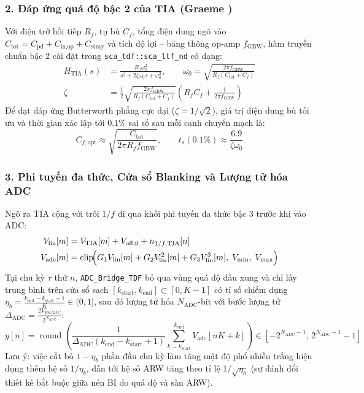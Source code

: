\documentclass[11pt, a4paper]{article}
\begin{document}
\subsubsection*{2. Đáp ứng quá độ bậc 2 của TIA (Graeme \cite{graeme1996})}
Với điện trở hồi tiếp $R_f$, tụ bù $C_f$, tổng điện dung ngõ vào $C_{\text{tot}} = C_{\text{pd}} + C_{\text{in,op}} + C_{\text{stray}}$ và tích độ lợi -- băng thông op-amp $f_{\text{GBW}}$, hàm truyền chuẩn bậc 2 cài đặt trong \texttt{sca\_tdf::sca\_ltf\_nd} có dạng:
\begin{align}
H_{\text{TIA}}(s) &= \frac{R_f \omega_0^2}{s^2 + 2\zeta\omega_0 s + \omega_0^2}, \qquad
\omega_0 = \sqrt{\frac{2\pi f_{\text{GBW}}}{R_f (C_{\text{tot}} + C_f)}} \\
\zeta &= \frac{1}{2}\sqrt{\frac{2\pi f_{\text{GBW}}}{R_f(C_{\text{tot}}+C_f)}}\left(R_f C_f + \frac{1}{2\pi f_{\text{GBW}}}\right)
\end{align}
Để đạt đáp ứng Butterworth phẳng cực đại ($\zeta = 1/\sqrt{2}$), giá trị điện dung bù tối ưu và thời gian xác lập tới $0.1\%$ sai số sau mỗi cạnh chuyển mạch là:
\begin{equation}
C_{f,\text{opt}} \approx \sqrt{\frac{C_{\text{tot}}}{2\pi R_f f_{\text{GBW}}}}, \qquad
t_s(0.1\%) \approx \frac{6.9}{\zeta \omega_0}
\end{equation}

\subsubsection*{3. Phi tuyến đa thức, Cửa sổ Blanking và Lượng tử hóa ADC}
Ngõ ra TIA cộng với trôi $1/f$ đi qua khối phi tuyến đa thức bậc 3 trước khi vào ADC:
\begin{align}
V_{\text{lin}}[m] &= V_{\text{TIA}}[m] + V_{\text{off,0}} + n_{1/f,\text{TIA}}[n] \\
V_{\text{adc}}[m] &= \operatorname{clip}\!\Bigl(G_1 V_{\text{lin}}[m] + G_2 V_{\text{lin}}^2[m] + G_3 V_{\text{lin}}^3[m],\; V_{\min},\; V_{\max}\Bigr)
\end{align}
Tại chu kỳ $\tau$ thứ $n$, \texttt{ADC\_Bridge\_TDF} bỏ qua vùng quá độ đầu xung và chỉ lấy trung bình trên cửa sổ sạch $[k_{\text{start}}, k_{\text{end}}] \subset [0, K-1]$ có tỉ số chiếm dụng $\eta_b = \frac{k_{\text{end}} - k_{\text{start}} + 1}{K} \in (0, 1]$, sau đó lượng tử hóa $N_{\text{ADC}}$-bit với bước lượng tử $\Delta_{\text{ADC}} = \frac{2 V_{\text{FS,ADC}}}{2^{N_{\text{ADC}}}}$:
\begin{equation}
y[n] = \operatorname{round}\!\left(\frac{1}{\Delta_{\text{ADC}}(k_{\text{end}} - k_{\text{start}} + 1)}\sum_{k=k_{\text{start}}}^{k_{\text{end}}} V_{\text{adc}}[nK + k]\right) \in [-2^{N_{\text{ADC}}-1},\, 2^{N_{\text{ADC}}-1}-1]
\end{equation}
Lưu ý: việc cắt bỏ $1 - \eta_b$ phần đầu chu kỳ làm tăng mật độ phổ nhiễu trắng hiệu dụng thêm hệ số $1/\eta_b$, dẫn tới hệ số ARW tăng theo tỉ lệ $1/\sqrt{\eta_b}$ (sự đánh đổi thiết kế bắt buộc giữa nén BI do quá độ và sàn ARW).
\end{document}
